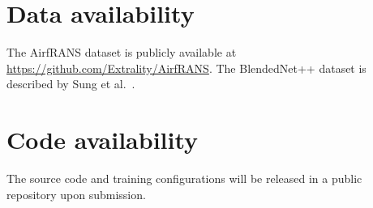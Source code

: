 \documentclass[final,3p,times]{elsarticle}
\begin{document}

\section*{Data availability}
The AirfRANS dataset is publicly available at \url{https://github.com/Extrality/AirfRANS}. The BlendedNet++ dataset is described by Sung et al.~\cite{sung2025blendednetpp}.

\section*{Code availability}
The source code and training configurations will be released in a public repository upon submission.


\FloatBarrier


\end{document}
